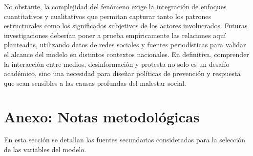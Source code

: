 \documentclass[12pt, a4paper]{article}
\begin{document}
No obstante, la complejidad del fenómeno exige la integración de enfoques cuantitativos y cualitativos que permitan capturar tanto los patrones estructurales como los significados subjetivos de los actores involucrados. Futuras investigaciones deberían poner a prueba empíricamente las relaciones aquí planteadas, utilizando datos de redes sociales y fuentes periodísticas para validar el alcance del modelo en distintos contextos nacionales. En definitiva, comprender la interacción entre medios, desinformación y protesta no solo es un desafío académico, sino una necesidad para diseñar políticas de prevención y respuesta que sean sensibles a las causas profundas del malestar social.

\appendix
\section{Anexo: Notas metodológicas}
En esta sección se detallan las fuentes secundarias consideradas para la selección de las variables del modelo.


\end{document}
